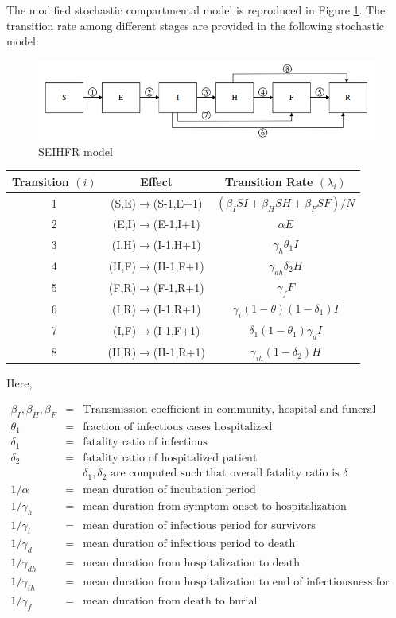 \documentclass[12pt, journal,onecolumn]{IEEEtran}
\begin{document}
The modified stochastic compartmental model is reproduced in Figure \ref{fig:SEIHFR_model}. The transition rate among different stages are provided in the following stochastic model:

\begin{figure}[h!]
\centering
\includegraphics[scale=0.5]{seihfr_model_fig}
\caption{SEIHFR model}
\label{fig:SEIHFR_model}
\end{figure}

\begin{center}
\begin{tabular}{|c|c|c|}
\hline 
Transition $(i)$ & Effect & Transition Rate $(\lambda_i)$ \tabularnewline
\hline 
\hline 
1 & (S,E)$\to$(S-1,E+1) & $(\beta_{I}SI+\beta_{H}SH+\beta_{F}SF)/N$\tabularnewline
\hline 
2 & (E,I)$\to$(E-1,I+1) & $\alpha E$\tabularnewline
\hline 
3 & (I,H)$\to$(I-1,H+1) & $\gamma_{h}\theta_{1}I$\tabularnewline
\hline 
4 & (H,F)$\to$(H-1,F+1) & $\gamma_{dh}\delta_{2}H$\tabularnewline
\hline 
5 & (F,R)$\to$(F-1,R+1) & $\gamma_{f}F$\tabularnewline
\hline 
6 & (I,R)$\to$(I-1,R+1) & $\gamma_{i}(1-\theta)(1-\delta_{1})I$\tabularnewline
\hline 
7 & (I,F)$\to$(I-1,F+1) & $\delta_{1}(1-\theta_{1})\gamma_{d}I$\tabularnewline
\hline 
8 & (H,R)$\to$(H-1,R+1) & $\gamma_{ih}(1-\delta_{2})H$\tabularnewline
\hline 
\end{tabular}
\end{center}

Here,

\begin{eqnarray*}
\beta_I, \beta_H, \beta_F &=& \text{Transmission coefficient in community, hospital and funeral respectively}\\
\theta_1 &=& \text{fraction of infectious cases hospitalized}\\
\delta_1 &=& \text{fatality ratio of infectious}\\
\delta_2 &=& \text{fatality ratio of hospitalized patient}\\
&& \delta_1, \delta_2 \text{ are computed such that overall fatality ratio is $\delta$}\\
1/\alpha &=& \text{mean duration of incubation period}\\
1/\gamma_h &=& \text{mean duration from symptom onset to hospitalization}\\
1/\gamma_{i} &=& \text{mean duration of infectious period for survivors}\\
1/\gamma_{d} &=& \text{mean duration of infectious period to death}\\
1/\gamma_{dh} &=& \text{mean duration from hospitalization to death}\\
1/\gamma_{ih} &=& \text{mean duration from hospitalization to end of infectiousness for survivors}\\
1/\gamma_{f} &=& \text{mean duration from death to burial}\\
\end{eqnarray*}
\end{document}
